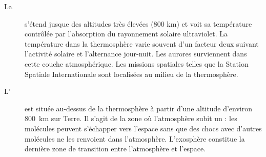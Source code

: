 \sk
\begin{description} 
\item[La ] s'étend jusque des altitudes très élevées (800 km) et voit sa température contrôlée par l'absorption du rayonnement solaire ultraviolet. La température dans la thermosphère varie souvent d'un facteur deux suivant l'activité solaire et l'alternance jour-nuit. Les aurores surviennent dans cette couche atmosphérique. Les missions spatiales  telles que la Station Spatiale Internationale sont localisées au milieu de la thermosphère. \normalsize
\item[L'] est située au-dessus de la thermosphère à partir d'une altitude d'environ~$800$~km sur Terre. Il s'agit de la zone où l'atmosphère subit un  : les molécules peuvent s'échapper vers l'espace sans que des chocs avec d'autres molécules ne les renvoient dans l'atmosphère. L'exosphère constitue la dernière zone de transition entre l'atmosphère et l'espace. \normalsize
\end{description}


